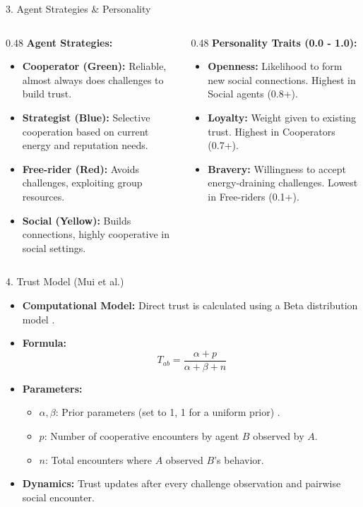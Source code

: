 \documentclass{beamer}
\begin{document}
\begin{frame}{3. Agent Strategies \& Personality}
    \begin{columns}[T]
        \begin{column}{0.48\textwidth}
            \textbf{Agent Strategies:}
            \begin{itemize}
                \item \textbf{Cooperator (Green):} Reliable, almost always does challenges to build trust.
                \item \textbf{Strategist (Blue):} Selective cooperation based on current energy and reputation needs.
                \item \textbf{Free-rider (Red):} Avoids challenges, exploiting group resources.
                \item \textbf{Social (Yellow):} Builds connections, highly cooperative in social settings.
            \end{itemize}
        \end{column}
        \begin{column}{0.48\textwidth}
            \textbf{Personality Traits (0.0 - 1.0):}
            \begin{itemize}
                \item \textbf{Openness:} Likelihood to form new social connections. Highest in Social agents (0.8+).
                \item \textbf{Loyalty:} Weight given to existing trust. Highest in Cooperators (0.7+).
                \item \textbf{Bravery:} Willingness to accept energy-draining challenges. Lowest in Free-riders (0.1+).
            \end{itemize}
        \end{column}
    \end{columns}
\end{frame}

\begin{frame}{4. Trust Model (Mui et al.)}
    \begin{itemize}
        \item \textbf{Computational Model:} Direct trust is calculated using a Beta distribution model \cite{Mui}.
        \item \textbf{Formula:} $$T_{ab} = \frac{\alpha + p}{\alpha + \beta + n}$$
        \item \textbf{Parameters:}
        \begin{itemize}
            \item $\alpha, \beta$: Prior parameters (set to 1, 1 for a uniform prior) \cite{Mui}.
            \item $p$: Number of cooperative encounters by agent $B$ observed by $A$.
            \item $n$: Total encounters where $A$ observed $B$'s behavior.
        \end{itemize}
        \item \textbf{Dynamics:} Trust updates after every challenge observation and pairwise social encounter.
    \end{itemize}
\end{frame}
\end{document}

